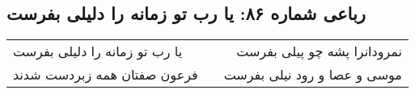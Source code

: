 \begin{center}
\section*{رباعی شماره ۸۶: یا رب تو زمانه را دلیلی بفرست}
\label{sec:sh086}
\begin{longtable}{l p{0.5cm} r}
یا رب تو زمانه را دلیلی بفرست
&&
نمرودانرا پشه چو پیلی بفرست
\\
فرعون صفتان همه زبردست شدند
&&
موسی و عصا و رود نیلی بفرست
\\
\end{longtable}
\end{center}
